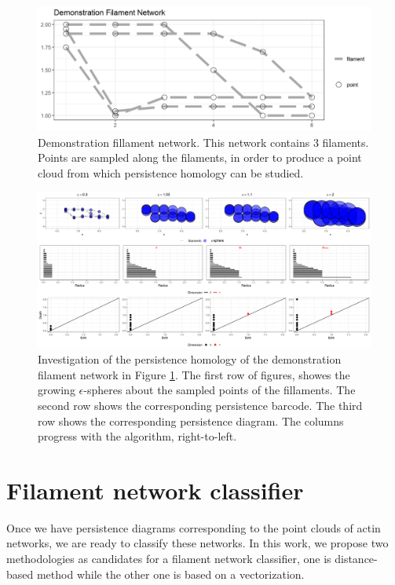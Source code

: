\documentclass[10pt]{article}
\begin{document}
\begin{figure}[!htbp]
	\begin{center}
		\includegraphics[width=1\textwidth]{figures/filaments_demo.png}
	\end{center}
	\caption{Demonstration fillament network. This network contains 3 filaments. Points are sampled along the filaments, in order to produce a point cloud from which persistence homology can be studied.}
	\label{fig:demoNetwork}
\end{figure}

\begin{figure}[!htbp]
	\begin{center}
		\includegraphics[width=1\textwidth]{figures/filaments_rips.png}
	\end{center}
	\caption{Investigation of the persistence homology of the demonstration filament network in Figure \ref{fig:demoNetwork}. The first row of figures, showes the growing $\epsilon$-spheres about the sampled points of the fillaments. The second row shows the corresponding persistence barcode. The third row shows the corresponding persistence diagram. The columns progress with the algorithm, right-to-left.}
	\label{fig:persistencediagram}
\end{figure}

\section{Filament network classifier}
Once we have persistence diagrams corresponding to the point clouds of actin networks, we are ready to classify these networks. In this work, we propose two methodologies as candidates for a filament network classifier, one is distance-based method while the other one is based on a vectorization.
\end{document}
